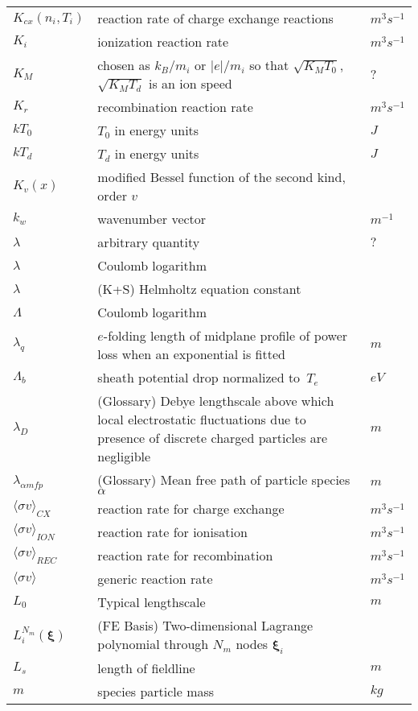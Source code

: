 \begin{longtable}{|p{3.0cm}|p{10.0cm}|p{3.0cm}|}
$K_{cx}\left( n_i, T_i \right)$ & reaction rate of charge exchange reactions  & $m^3 s^{-1}$ \\
$K_i$ & ionization reaction rate  & $m^3 s^{-1}$ \\
$K_M$ & chosen as $k_B/m_i$ or $|e|/m_i$ so that $\sqrt{K_MT_0}$, $\sqrt{K_MT_d}$ is an ion speed & $?$ \\
$K_r$ & recombination reaction rate  & $m^3 s^{-1}$ \\
$kT_0$ & $T_0$ in energy units  & $J$ \\
$kT_d$ & $T_d$ in energy units  & $J$ \\
$K_v(x)$ & modified Bessel function of the second kind, order $v$  & \\
$k_w$ & wavenumber vector & $m^{-1}$ \\
$\lambda$ & arbitrary quantity  & $?$ \\
$\lambda$ & Coulomb logarithm & \\
$\lambda$ &  (K+S) Helmholtz equation constant & \\
$\Lambda$ & Coulomb logarithm & \\
$\lambda_q$ & $e$-folding length of midplane profile of power loss when an exponential is fitted & $m$ \\
$\Lambda_b$ & sheath potential drop normalized to~$T_e$  & $eV$ \\
$\lambda_D$ & (Glossary) Debye lengthscale above which local electrostatic fluctuations due to presence of discrete charged particles are negligible  & $m$ \\
$\lambda_{\alpha mfp}$ & (Glossary) Mean free path of particle species~$\alpha$ & $m$  \\
$\langle \sigma v \rangle_{CX}$ & reaction rate for charge exchange  & $m^3 s^{-1}$ \\
$\langle \sigma v \rangle_{ION}$ & reaction rate for ionisation  & $m^3 s^{-1}$ \\
$\langle \sigma v \rangle_{REC}$ & reaction rate for recombination  & $m^3 s^{-1}$ \\
$\langle\sigma v\rangle$ & generic reaction rate  & $m^3 s^{-1}$ \\
$L_0$ & Typical lengthscale  & $m$ \\
$L_i^{N_m}(\boldsymbol{\xi})$ &  (FE Basis) Two-dimensional Lagrange polynomial through $N_m$ nodes ${\mathbf \xi}_i$ & \\
$L_s$ & length of fieldline  & $m$ \\
$m$ & species particle mass & $kg$ \\

\end{longtable}
